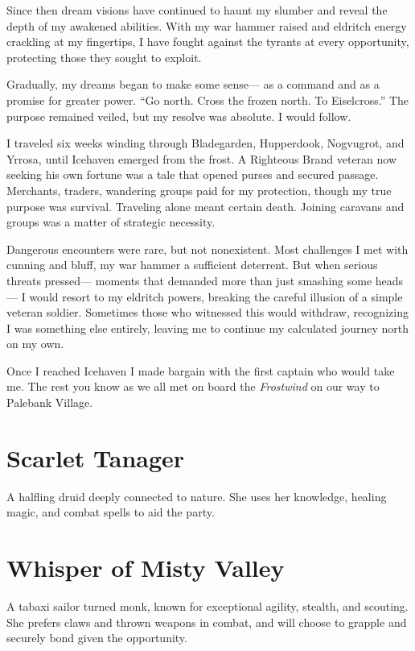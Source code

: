 \documentclass[
  letterpaper,12pt,twoside,twocolumn,openany,
  nodeprecatedcode,bg=full]{dndbook}
\begin{document}
Since then dream visions have continued to haunt my slumber and reveal
the depth of my awakened abilities. With my war hammer raised and
eldritch energy crackling at my fingertips, I have fought against the
tyrants at every opportunity, protecting those they sought to exploit.

Gradually, my dreams began to make some sense--- as a command and as a
promise for greater power. ``Go north. Cross the frozen north. To
Eiselcross.'' The purpose remained veiled, but my resolve was absolute.
I would follow.

I traveled six weeks winding through Bladegarden, Hupperdook, Nogvugrot,
and Yrrosa, until Icehaven emerged from the frost. A Righteous Brand
veteran now seeking his own fortune was a tale that opened purses and
secured passage. Merchants, traders, wandering groups paid for my
protection, though my true purpose was survival. Traveling alone meant
certain death. Joining caravans and groups was a matter of strategic
necessity.

Dangerous encounters were rare, but not nonexistent. Most challenges I
met with cunning and bluff, my war hammer a sufficient deterrent. But
when serious threats pressed--- moments that demanded more than just
smashing some heads--- I would resort to my eldritch powers, breaking
the careful illusion of a simple veteran soldier. Sometimes those who
witnessed this would withdraw, recognizing I was something else
entirely, leaving me to continue my calculated journey north on my own.

Once I reached Icehaven I made bargain with the first captain who would
take me. The rest you know as we all met on board the \emph{Frostwind}
on our way to Palebank Village.

\chapter{Scarlet Tanager}\label{scarlet-tanager}

A halfling druid deeply connected to nature. She uses her knowledge,
healing magic, and combat spells to aid the party.

\chapter{Whisper of Misty Valley}\label{whisper-of-misty-valley}

A tabaxi sailor turned monk, known for exceptional agility, stealth, and
scouting. She prefers claws and thrown weapons in combat, and will
choose to grapple and securely bond given the opportunity.
\end{document}

